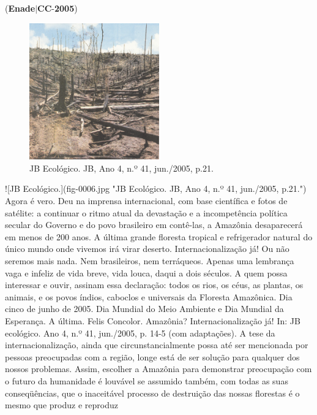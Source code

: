 \documentclass{exam}
\begin{document}
\begin{questions}
\begin{enumerate}[label=\alph*)]
	\end{enumerate}

\question (\textbf{Enade}$|$\textbf{CC}-\textbf{2005}) \begin{figure}[H]
	\begin{center}
		\includegraphics[width=0.5\textwidth]{CIENCIA_DA_COMPUTACAO_Prova2005-utf8_figuras/fig-0006.jpg}
		\caption{JB Ecológico. JB, Ano 4, n.º 41, jun./2005, p.21.}
	\end{center}
\end{figure}
![JB Ecológico.](fig-0006.jpg "JB Ecológico. JB, Ano 4, n.º 41, jun./2005, p.21.")
Agora é vero. Deu na imprensa internacional, com base científica
e fotos de satélite: a continuar o ritmo atual da devastação e a
incompetência política secular do Governo e do povo brasileiro em
contê-las, a Amazônia desaparecerá em menos de 200 anos. A última
grande floresta tropical e refrigerador natural do único mundo onde
vivemos irá virar deserto.
Internacionalização já! Ou não seremos mais nada. Nem
brasileiros, nem terráqueos. Apenas uma lembrança vaga e infeliz de vida
breve, vida louca, daqui a dois séculos.
A quem possa interessar e ouvir, assinam essa declaração: todos
os rios, os céus, as plantas, os animais, e os povos índios, caboclos e
universais da Floresta Amazônica. Dia cinco de junho de 2005.
Dia Mundial do Meio Ambiente e Dia Mundial da Esperança. A última.
Felis Concolor. Amazônia? Internacionalização já! In:
JB ecológico. Ano 4, n.º 41, jun./2005, p. 14-5 (com adaptações).
A tese da internacionalização, ainda que circunstancialmente
possa até ser mencionada por pessoas preocupadas com a região, longe está de ser solução para qualquer dos nossos problemas.
Assim, escolher a Amazônia para demonstrar preocupação com o futuro da humanidade é louvável se assumido também, com
todas as suas conseqüências, que o inaceitável processo de destruição das nossas florestas é o mesmo que produz e reproduz

\end{questions}
\end{document}
